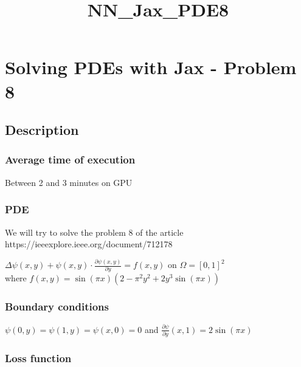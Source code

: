 \documentclass[11pt]{article}
\title{NN\_Jax\_PDE8}
\begin{document}
    
    \maketitle
    
    

    
    \hypertarget{solving-pdes-with-jax---problem-8}{%
\section{Solving PDEs with Jax - Problem
8}\label{solving-pdes-with-jax---problem-8}}

\hypertarget{description}{%
\subsection{Description}\label{description}}

\hypertarget{average-time-of-execution}{%
\subsubsection{Average time of
execution}\label{average-time-of-execution}}

Between 2 and 3 minutes on GPU

\hypertarget{pde}{%
\subsubsection{PDE}\label{pde}}

We will try to solve the problem 8 of the article
https://ieeexplore.ieee.org/document/712178

\(\Delta \psi(x,y) +\psi(x,y)\cdot\frac{\partial \psi(x,y)}{\partial y}= f(x,y)\)
on \(\Omega = [0,1]^2\)\\
where \(f(x, y)=\sin(\pi x)(2-\pi^2y^2+2y^3\sin(\pi x))\)

\hypertarget{boundary-conditions}{%
\subsubsection{Boundary conditions}\label{boundary-conditions}}

\(\psi(0,y)=\psi(1,y)=\psi(x,0)=0\) and
\(\frac{\partial \psi}{\partial y}(x,1)=2\sin(\pi x)\)

\hypertarget{loss-function}{%
\subsubsection{Loss function}\label{loss-function}}
\end{document}
